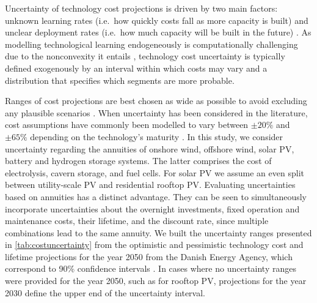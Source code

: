 
Uncertainty of technology cost projections is driven by two main factors:
unknown learning rates (i.e.~how quickly costs fall as more capacity is built) and
unclear deployment rates (i.e.~how much capacity will be built in the future) \cite{gritsevskyi_modeling_2000,yeh_review_2012}.
As modelling technological learning endogeneously is computationally challenging due to the nonconvexity it entails \cite{heuberger_power_2017,mattsson_learning_2019,lisa_learning2022},
technology cost uncertainty is typically defined exogenously by an interval within which costs may vary
and a distribution that specifies which segments are more probable.


Ranges of cost projections are best chosen as wide as possible to avoid
excluding any plausible scenarios
\cite{moret_characterization_2017,mccollum_energy_2020}. When uncertainty has
been considered in the literature, cost assumptions have commonly been modelled
to vary between $\pm20\%$ and $\pm65\%$ depending on the technology's maturity
\cite{moret_characterization_2017,shirizadeh_how_2019,pizarro-alonso_uncertainties_2019,li_using_2020,trondle_trade-offs_2020}.
In this study, we consider uncertainty regarding the annuities of onshore wind,
offshore wind, solar PV, battery and hydrogen storage systems. The latter
comprises the cost of electrolysis, cavern storage, and fuel cells. For solar PV
we assume an even split between utility-scale PV and residential rooftop PV.
Evaluating uncertainties based on annuities has a distinct advantage. They can
be seen to simultaneously incorporate uncertainties about the overnight
investments, fixed operation and maintenance costs, their lifetime, and the
discount rate, since multiple combinations lead to the same annuity. We built
the uncertainty ranges presented in \cref{tab:costuncertainty} from the
optimistic and pessimistic technology cost and lifetime projections for the year
2050 from the Danish Energy Agency, which correspond to 90\% confidence
intervals \cite{DEA}. In cases where no uncertainty ranges were provided
for the year 2050, such as for rooftop PV, projections for the year 2030
define the upper end of the uncertainty interval.



